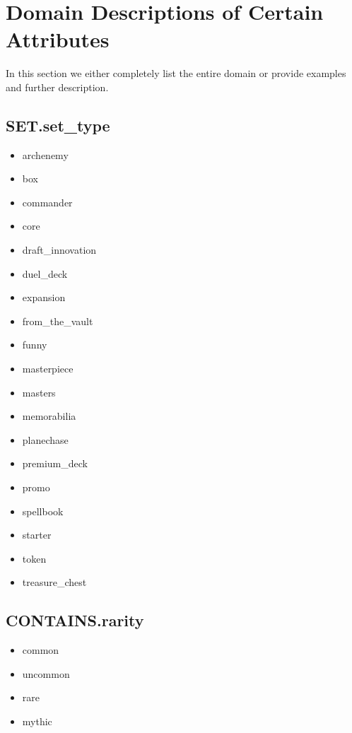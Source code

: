 \documentclass{article}
\begin{document}

\section{Domain Descriptions of Certain Attributes}
In this section we either completely list the entire domain or provide examples and further description.

\subsection{SET.set\_type}
\begin{multicols}{3}
    \begin{itemize}
            \item archenemy
            \item box
            \item commander
            \item core
            \item draft\_innovation
            \item duel\_deck
            \item expansion
            \item from\_the\_vault
            \item funny
            \item masterpiece
            \item masters
            \item memorabilia
            \item planechase
            \item premium\_deck
            \item promo
            \item spellbook
            \item starter
            \item token
            \item treasure\_chest
    \end{itemize}
\end{multicols}

\subsection{CONTAINS.rarity}
\begin{multicols}{3}
    \begin{itemize}
            \item common
            \item uncommon
            \item rare
            \item mythic
    \end{itemize}
\end{multicols}
\end{document}
